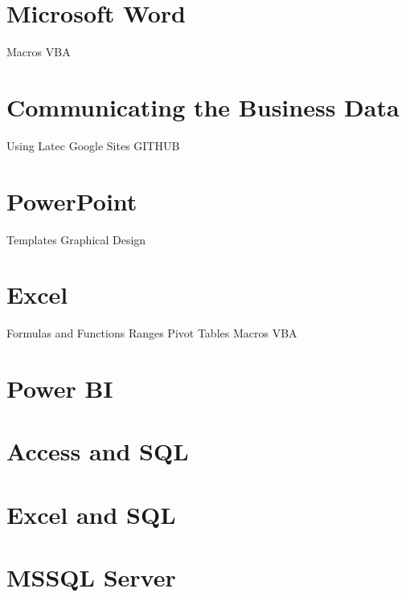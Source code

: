 \section * {Microsoft Word}
Macros
VBA

\section * {Communicating the Business Data}
Using Latec
Google Sites
GITHUB

\section * {PowerPoint}
Templates
Graphical Design

\section * {Excel}
Formulas and Functions
Ranges
Pivot Tables
Macros
VBA


\section * {Power BI}

\section * {Access and SQL}

\section * {Excel and SQL}

\section * {MSSQL Server}
